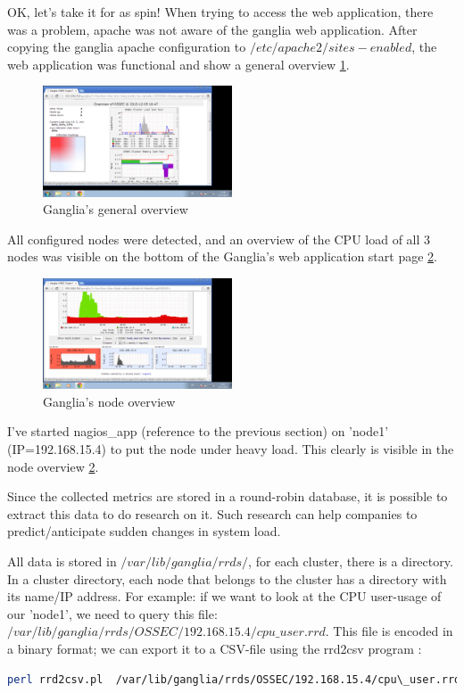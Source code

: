 \documentclass[12pt]{report}
\begin{document}
OK, let's take it for as spin! When trying to access the web
application, there was a problem, apache was not aware of the ganglia
web application. After copying the ganglia apache configuration to
$/etc/apache2/sites-enabled$, the web application was functional and
show a general overview \cref{fig:ganglia_general}.
\begin{figure}[h!]
  \caption{Ganglia's general overview}
  \label{fig:ganglia_general}
  \centering
    \includegraphics[width=0.5\textwidth]{pics/ganglia_general.png}
\end{figure}
All configured nodes were detected, and an overview of the CPU load of
all 3 nodes was visible on the bottom of the Ganglia's web application
start page  \cref{fig:ganglia_node_overview}.
\begin{figure}[h!]
  \caption{Ganglia's node overview}
  \label{fig:ganglia_node_overview}
  \centering
    \includegraphics[width=0.5\textwidth]{pics/ganglia_node_overview.png}
\end{figure}
I've started nagios\_app (reference to the previous section) on 'node1'
(IP=192.168.15.4) to put the node under heavy load. This clearly is
visible in the node overview \cref{fig:ganglia_node_overview}.

Since the collected metrics are stored in a round-robin database, it is possible to
extract this data to do research on it. Such research can help
companies to predict/anticipate sudden changes in system load.

All data is stored in $/var/lib/ganglia/rrds/$, for each cluster,
there is a directory. In a cluster directory, each node that belongs
to the cluster has a directory with its name/IP address.
For example: if we want to look at the CPU user-usage of our 'node1',
we need to query this file:
$/var/lib/ganglia/rrds/OSSEC/192.168.15.4/cpu\_user.rrd$. This file is
encoded in a binary format; we can export it to a CSV-file using the
rrd2csv program \cite{rrd2csv}:
\begin{lstlisting}[language=bash]
perl rrd2csv.pl  /var/lib/ganglia/rrds/OSSEC/192.168.15.4/cpu\_user.rrd > node1_cpu_user.csv
\end{lstlisting} 
\end{document}
